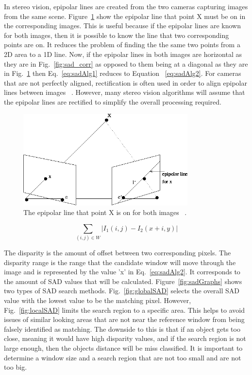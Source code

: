 In stereo vision, epipolar lines are created from the two cameras capturing images from the same scene. Figure~\ref{fig:epipolar} show the epipolar line that point X must be on in the corresponding images. This is useful because if the epipolar lines are known for both images, then it is possible to know the line that two corresponding points are on. It reduces the problem of finding the the same two points from a 2D area to a 1D line. Now, if the epipolar lines in both images are horizontal as they are in Fig.~\ref{fig:sad_corr} as opposed to them being at a diagonal as they are in Fig.~\ref{fig:epipolar} then Eq.~\ref{eq:sadAlg1} reduces to Equation ~\ref{eq:sadAlg2}. For cameras that are not perfectly aligned, rectification is often used in order to align epipolar lines between images ~\cite{rectification}. However, many stereo vision algorithms will assume that the epipolar lines are rectified to simplify the overall processing required.

\begin{figure}
\begin{center}
	\includegraphics[height=50mm]{figures/epipolar.png}
	\captionfonts
	\caption{The epipolar line that point X is on for both images ~\cite{epipolar}.}
	\label{fig:epipolar}
\end{center}
\end{figure}

\begin{equation}
	\sum\limits_{(i,j)\in W}\left| I_{1}(i,j)-I_{2}(x+i,y) \right|
	\label{eq:sadAlg2}
\end{equation}

The disparity is the amount of offset between two corresponding pixels. The disparity range is the range that the candidate window will move through the image and is represented by the value 'x' in Eq.~\ref{eq:sadAlg2}. It corresponds to the amount of SAD values that will be calculated. Figure~\ref{fig:sadGraphs} shows two types of SAD search methods. Fig.~\ref{fig:globalSAD} selects the overall SAD value with the lowest value to be the matching pixel. However, Fig.~\ref{fig:localSAD} limits the search region to a specific area. This helps to avoid issues of similar looking areas that are not near the reference window from being falsely identified as matching. The downside to this is that if an object gets too close, meaning it would have high disparity values, and if the search region is not large enough, then the objects distance will be miss classified. It is important to determine a window size and a search region that are not too small and are not too big.

